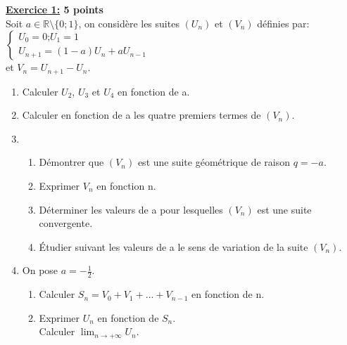 \documentclass[a4paper,12pt]{book}
\begin{document}
\textbf{\underline{Exercice 1:} 5 points}\\
Soit $a \in \mathbb{R}\setminus \{0;1 \}$, on considère les suites $(U_n)$ et $(V_n)$ définies par:
$\begin{cases}
U_0=0 \textbf{;} U_1=1 \\
U_{n+1}=(1-a)U_n + aU_{n-1}	
\end{cases}$\\
et $V_n=U_{n+1}-U_n$.
\begin{enumerate}
	\item Calculer  $U_2$, $U_3$ et $U_4$ en fonction de a.
	\item Calculer en fonction de a les quatre premiers termes de $(V_n)$.
	\item
	\begin{enumerate}
		\item Démontrer que $(V_n )$ est une suite géométrique de raison $q=-a$.
		\item Exprimer $V_n$ en fonction n.
		\item Déterminer les valeurs de a pour lesquelles $(V_n)$ est une suite convergente.
		\item Étudier suivant les valeurs de a le sens de variation de la suite $(V_n)$.
	\end{enumerate}
	\item On pose $a=-\displaystyle{\frac{1}{2}}$.
	\begin{enumerate}
		\item Calculer $S_n=V_0+V_1+...+V_{n-1}$ en fonction de n.
		\item Exprimer $U_n$ en fonction de $S_n$.\\
		Calculer $\displaystyle{\lim_{n \to + \infty}U_n}$.
	\end{enumerate}
\end{enumerate}
\end{document}
